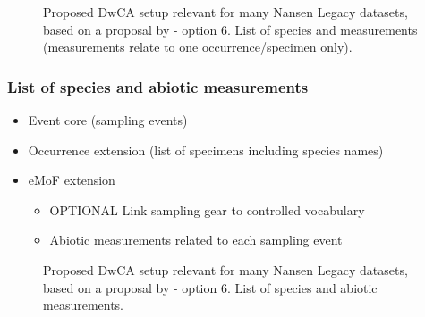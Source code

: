 \documentclass[a4paper,english, 11pt]{article}
\begin{document}
\begin{figure}[H]
    \caption{\label{fig:dwca_aen_eg2}
        Proposed DwCA setup relevant for many Nansen Legacy datasets, based on a proposal by \cite{de2017toward} - option 6. List of species and measurements (measurements relate to one occurrence/specimen only).
    }
\end{figure}

\subsubsection{List of species and abiotic measurements}
\label{ss:abioticmeasurements}

\begin{itemize}
\item Event core (sampling events)
\item Occurrence extension (list of specimens including species names)
\item eMoF extension
\begin{itemize}
\item OPTIONAL Link sampling gear to controlled vocabulary
\item Abiotic measurements related to each sampling event
\end{itemize}
\end{itemize}

\begin{figure}[H]
    \caption{\label{fig:dwca_aen_eg3}
        Proposed DwCA setup relevant for many Nansen Legacy datasets, based on a proposal by \cite{de2017toward} - option 6. List of species and abiotic measurements.
    }
\end{figure}
\end{document}
